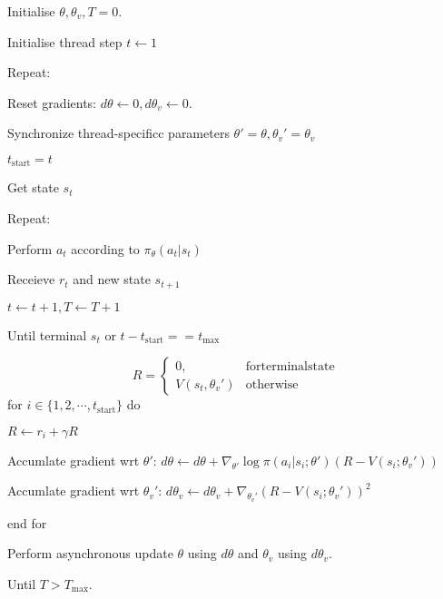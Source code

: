 \documentclass[11pt,a4paper]{article}
\begin{document}
\begin{tcolorbox}[title=A3C algorithm]
Initialise $\theta,\theta_v, T=0$.\par 
Initialise thread step $t \leftarrow 1$ \par 
Repeat:\par 
\hspace{1cm} Reset gradients: $d\theta \leftarrow 0, d\theta_v \leftarrow 0$. \par 
\hspace{1cm} Synchronize thread-specificc parameters $\theta' =\theta, \theta_v'=\theta_v$\par 
\hspace{1cm} $t_{\mathrm{start}} = t$ \par 
\hspace{1cm} Get state $s_t$ \par 
\hspace{1cm} Repeat:\par 
\hspace{2cm} Perform $a_t$ according to $\pi_{\theta}(a_t|s_t)$ \par 
\hspace{2cm} Receieve $r_t$ and new state $s_{t+1}$\par
\hspace{2cm} $t \leftarrow t+1, T \leftarrow T+1 $ \par 
\hspace{1cm} Until terminal $s_t$ or $t-t_{\mathrm{start}} == t_{\max}$ \par 
\hspace{1cm} 
\begin{equation}
    R = \left\{\begin{array}{cc}
        0, & \mathrm{for terminal state} \\ 
        V(s_t, \theta_v') & \mathrm{otherwise}
    \end{array}\right.
\end{equation}
\hspace{1cm} for $i \in \{1,2,\cdots,t_{\mathrm{start}}\}$ do\par 
\hspace{2cm} $R \leftarrow r_i + \gamma R$ \par 
\hspace{2cm} Accumlate gradient wrt $\theta'$: $d\theta \leftarrow d\theta + \nabla_{\theta'} \log \pi(a_i|s_i;\theta')(R-V(s_i;\theta_v'))$ \par 
\hspace{2cm} Accumlate gradient wrt $\theta_v'$: $d\theta_v \leftarrow d\theta_v + \nabla_{\theta_v'}(R-V(s_i;\theta_v'))^2$\par 
\hspace{1cm} end for\par 
\hspace{1cm} Perform asynchronous update $\theta$ using $d\theta$ and $\theta_v$ using $d\theta_v$. \par 
Until $T > T_{\max}$. 
\end{tcolorbox}





\clearpage


\end{document}
